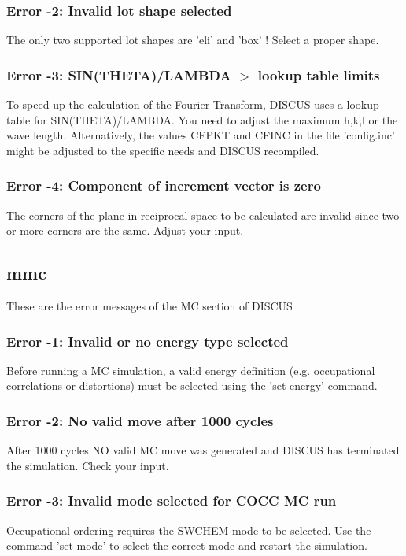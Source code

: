 \subsubsection{Error -2: Invalid lot shape selected}
\par
The only two supported lot shapes are 'eli' and 'box' ! Select a 
proper shape. 
\subsubsection{Error -3: SIN(THETA)/LAMBDA $> $ lookup table limits}
\par
To speed up the calculation of the Fourier Transform, DISCUS uses 
a lookup table for SIN(THETA)/LAMBDA. You need to adjust the maximum 
h,k,l or the wave length. Alternatively, the values CFPKT and CFINC 
in the file 'config.inc' might be adjusted to the specific needs 
and DISCUS recompiled. 
\subsubsection{Error -4: Component of increment vector is zero}
\par
The corners of the plane in reciprocal space to be calculated are 
invalid since two or more corners are the same. Adjust your input. 
\subsection*{mmc}
These are the error messages of the MC section of DISCUS 
\par
\subsubsection{Error -1: Invalid or no energy type selected}
\par
Before running a MC simulation, a valid energy definition (e.g. 
occupational correlations or distortions) must be selected using 
the 'set energy' command. 
\subsubsection{Error -2: No valid move after 1000 cycles}
\par
After 1000 cycles NO valid MC move was generated and DISCUS has 
terminated the simulation. Check your input. 
\subsubsection{Error -3: Invalid mode selected for COCC MC run}
\par
Occupational ordering requires the SWCHEM mode to be selected. Use 
the command 'set mode' to select the correct mode and restart the 
simulation. 
